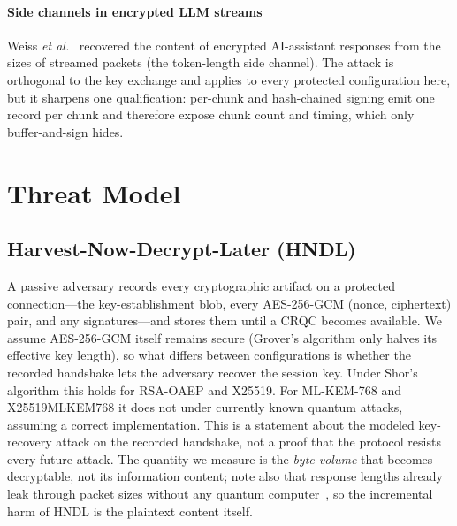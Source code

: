 \documentclass[conference]{IEEEtran}
\begin{document}
\paragraph*{Side channels in encrypted LLM streams}
Weiss \emph{et al.}~\cite{weiss2024keylogging} recovered the content of encrypted AI-assistant
responses from the sizes of streamed packets (the token-length side channel). The attack is
orthogonal to the key exchange and applies to every protected configuration here, but it sharpens one
qualification: per-chunk and hash-chained signing emit one record per chunk and therefore expose
chunk count and timing, which only buffer-and-sign hides.

\section{Threat Model}\label{sec:threats}

\subsection{Harvest-Now-Decrypt-Later (HNDL)}
A passive adversary records every cryptographic artifact on a protected connection---the
key-establishment blob, every AES-256-GCM (nonce, ciphertext) pair, and any signatures---and stores
them until a CRQC becomes available. We assume AES-256-GCM itself remains secure (Grover's algorithm
only halves its effective key length), so what differs between configurations is whether the recorded
handshake lets the adversary recover the session key. Under Shor's algorithm this holds for
RSA-OAEP and X25519. For ML-KEM-768 and X25519MLKEM768 it does not under currently known quantum
attacks, assuming a correct implementation. This is a statement about the modeled key-recovery attack
on the recorded handshake, not a proof that the protocol resists every future attack. The quantity we
measure is the \emph{byte volume} that becomes decryptable, not its information content; note also that
response lengths already leak through packet sizes without any quantum computer~\cite{weiss2024keylogging},
so the incremental harm of HNDL is the plaintext content itself.
\end{document}
